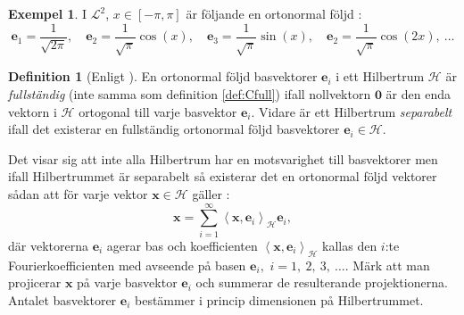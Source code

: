 \documentclass[a4paper, 12pt]{report}
\theoremstyle{definition}
\newtheorem{defi}{Definition}[section]
\newtheorem{ex}{Exempel}[section]
\theoremstyle{remark}
\newcommand{\bfx}{\mathbf{x}}
\newcommand{\hil}{\mathcal{H}}
\begin{document}
\begin{ex}
I $\mathcal{L}^2$, $x\in\left[-\pi, \pi\right]$ är följande en ortonormal följd \cite{Young}:
\begin{equation*}
	\mathbf{e}_1=\frac{1}{\sqrt{2\pi}},\quad\mathbf{e}_2=\frac{1}{\sqrt{\pi}}\cos\left(x\right),\quad\mathbf{e}_3=\frac{1}{\sqrt{\pi}}\sin\left(x\right),\quad\mathbf{e}_2=\frac{1}{\sqrt{\pi}}\cos\left(2x\right),~\dots
\end{equation*}
\end{ex}


\begin{defi}[Enligt \cite{Young}]
	En ortonormal följd basvektorer $\mathbf{e}_i$ i ett Hilbertrum $\hil$ är \emph{fullständig} (inte samma som definition \ref{def:Cfull}) ifall nollvektorn $\mathbf{0}$ är den enda vektorn i $\hil$ ortogonal till varje basvektor $\mathbf{e}_i$. Vidare är ett Hilbertrum \emph{separabelt} ifall det existerar en fullständig ortonormal följd basvektorer $\mathbf{e}_i\in\hil$.
\end{defi}

Det visar sig att inte alla Hilbertrum har en motsvarighet till basvektorer men ifall Hilbertrummet är separabelt så existerar det en ortonormal följd vektorer sådan att för varje vektor $\mathbf{x}\in \mathcal{H}$  gäller \cite{Young}:
\begin{equation*}
\mathbf{x}=\sum_{i=1}^{\infty}\left\langle \mathbf{x}, \mathbf{e}_i \right\rangle_\hil \mathbf{e}_i,
\end{equation*}
där vektorerna $\mathbf{e}_i$ agerar bas och koefficienten $\left\langle \mathbf{x}, \mathbf{e}_i \right\rangle_\hil$ kallas den $i$:te Fourierkoefficienten med avseende på basen $\mathbf{e}_i,$ $i=1,~2,~3,~\dots$.
Märk att man projicerar $\bfx$ på varje basvektor $\mathbf{e}_i$ och summerar de resulterande projektionerna.
Antalet basvektorer $\mathbf{e}_i$ bestämmer i princip dimensionen på Hilbertrummet.


\end{document}

